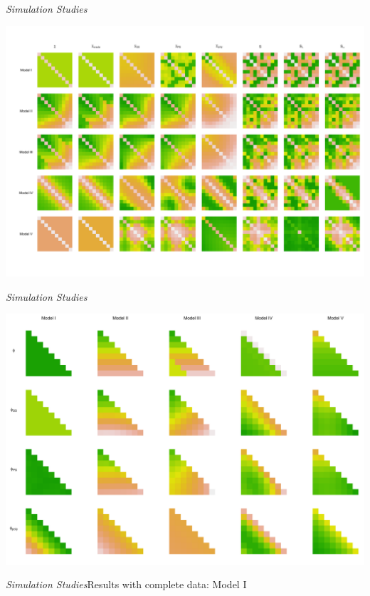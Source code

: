 \begin{frame}[c]{\emph{Simulation Studies}}{}
 
\begin{center}
 \includegraphics[width = \textwidth]{img/chapter-4/cov-estimate-lattice-beamer}%
\end{center}
\end{frame}


\begin{frame}[c]{\emph{Simulation Studies}}{}
 
\begin{center}
  \includegraphics[width = \textwidth]{img/chapter-4/cholesky-estimate-lattice-beamer}%
\end{center}
\end{frame}


\begin{frame}[c]{\emph{Simulation Studies}}{Results with complete data: Model I}
\centering
\end{frame}

